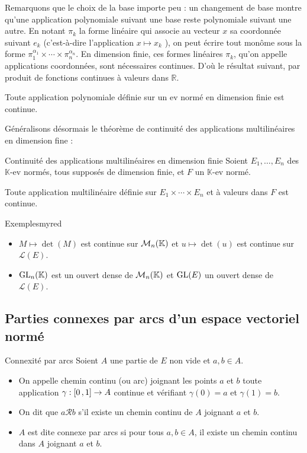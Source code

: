     Remarquons que le choix de la base importe peu : un changement de base montre qu’une application polynomiale suivant une base reste polynomiale suivant une autre.
    En notant $\pi_k$ la forme linéaire qui associe au vecteur $x$ sa coordonnée suivant $e_k$ (c’est-à-dire l’application $x \mapsto x_k$ ), on peut écrire tout monôme sous la forme $\pi_{1}^{\alpha_1} \times \cdots \times \pi_n^{\alpha_n}$. En dimension finie, ces formes linéaires $\pi_k$, qu’on appelle applications coordonnées, sont nécessaires continues. D’où le résultat suivant, par produit de fonctions continues à valeurs dans $\mathbb{R}$.

    \begin{prop}{}{}
        Toute application polynomiale définie sur un ev normé en dimension finie est continue.
    \end{prop}

    Généralisons désormais le théorème de continuité des applications multilinéaires en dimension fine :

    \begin{theo}{Continuité des applications multilinéaires en dimension finie}{}
        Soient $E_1,\ldots, E_n$ des $\mathbb{K}$-ev normés, tous supposés de dimension finie, et $F$ un $\mathbb{K}$-ev normé.

        Toute application multilinéaire définie sur $E_1 \times \cdots \times E_n$ et à valeurs dans $F$ est continue.
    \end{theo}

    \begin{omed}{Exemples}{myred}
        \begin{itemize}
            \item $M \mapsto \det(M)$ est continue sur $\mathcal{M}_{n}(\mathbb{K})$ et $u \mapsto \det(u)$ est continue sur $\mathcal{L}(E)$.
            \item $\operatorname{GL}_n(\mathbb{K})$ est un ouvert dense de $\mathcal{M}_{n}(\mathbb{K})$ et $\operatorname{GL}(E)$ un ouvert dense de $\mathcal{L}(E)$.
        \end{itemize}
    \end{omed}

\subsection{Parties connexes par arcs d’un espace vectoriel normé}

    \begin{defi}{Connexité par arcs}{}
        Soient $A$ une partie de $E$ non vide et $a,b \in A$. 
        \begin{itemize}
            \item On appelle chemin continu (ou arc) joignant les points $a$ et $b$ toute application $\gamma : \left[ 0 \, , 1 \right] \rightarrow A$ continue et vérifiant $\gamma(0) = a$ et $\gamma(1) = b$. 
            \item On dit que $a \mathcal{R} b$ s’il existe un chemin continu de $A$ joignant $a$ et $b$.
            \item $A$ est dite connexe par arcs si pour tous $a,b \in A$, il existe un chemin continu dans $A$ joignant $a$ et $b$.
        \end{itemize}
    \end{defi}

